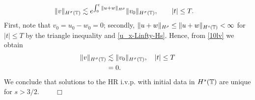 	\begin{equation}
		\label{10lv}
		\begin{split}
			\|v\|_{H^\sigma(\mathbb{T})}
			& \lesssim e^{\int_0^t \|u+w\|_{H^{\rho}}}
			\|v_0\|_{H^\sigma(\mathbb{T})}, \qquad |t| \le T.
		\end{split}
	\end{equation}
	First, note that $v_0 = u_0 - w_0 = 0$; secondly, $\|u + w \|_{H^\rho}
	\le \|u + w \|_{H^s(\mathbb{T})} < \infty$ for $|t| \le T$ by
	the triangle inequality and \eqref{u_x-Linfty-Hs}. Hence, from
	\eqref{10lv} we obtain
	\begin{equation*}
		\begin{split}
			\|v\|_{H^\sigma(\mathbb{T})}
			& \lesssim \|v_0\|_{H^\sigma(\mathbb{T})}, \quad |t| \le T	
			\\
			& = 0.
		\end{split}
	\end{equation*}
	We conclude that solutions to the HR i.v.p. with initial data in
	$H^s(\mathbb{T})$ are unique for $s > 3/2$.  $\qquad
	\Box$
